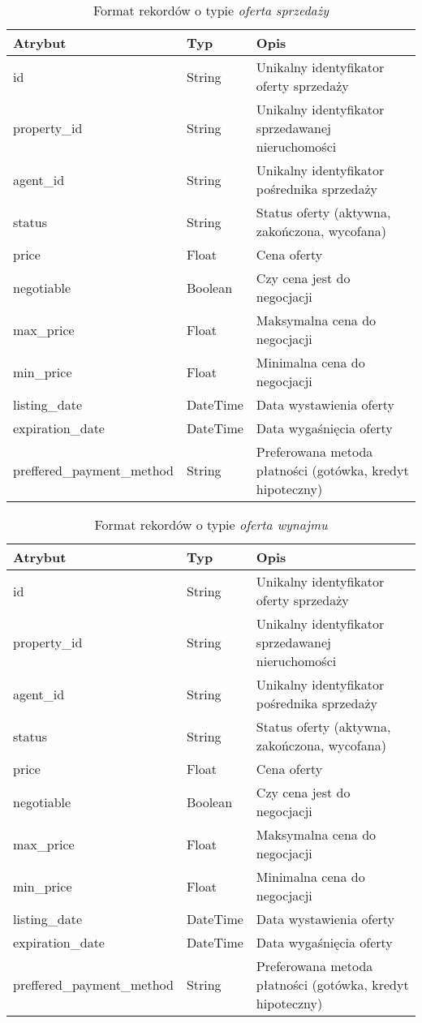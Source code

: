 \begin{table}[H]
    \caption{Format rekordów o typie \textit{oferta sprzedaży}}
    \centering
    \begin{tabular}{|l|l|l|}
    \hline
    \textbf{Atrybut} & \textbf{Typ} & \textbf{Opis} \\
    \hline
    id & String & Unikalny identyfikator oferty sprzedaży \\
    property\_id & String & Unikalny identyfikator sprzedawanej nieruchomości \\
    agent\_id & String & Unikalny identyfikator pośrednika sprzedaży \\
    status & String & Status oferty (aktywna, zakończona, wycofana) \\
    price & Float & Cena oferty \\
    negotiable & Boolean & Czy cena jest do negocjacji \\    
    max\_price & Float & Maksymalna cena do negocjacji \\
    min\_price & Float & Minimalna cena do negocjacji \\
    listing\_date & DateTime & Data wystawienia oferty \\
    expiration\_date & DateTime & Data wygaśnięcia oferty \\
    preffered\_payment\_method & String & Preferowana metoda płatności (gotówka, kredyt hipoteczny) \\
    \hline
    \end{tabular}
    \label{tab:sell_offer_details}
\end{table}

\begin{table}[H]
    \caption{Format rekordów o typie \textit{oferta wynajmu}}
    \centering
    \begin{tabular}{|l|l|l|}
    \hline
    \textbf{Atrybut} & \textbf{Typ} & \textbf{Opis} \\
    \hline
    id & String & Unikalny identyfikator oferty sprzedaży \\
    property\_id & String & Unikalny identyfikator sprzedawanej nieruchomości \\
    agent\_id & String & Unikalny identyfikator pośrednika sprzedaży \\
    status & String & Status oferty (aktywna, zakończona, wycofana) \\
    price & Float & Cena oferty \\
    negotiable & Boolean & Czy cena jest do negocjacji \\    
    max\_price & Float & Maksymalna cena do negocjacji \\
    min\_price & Float & Minimalna cena do negocjacji \\
    listing\_date & DateTime & Data wystawienia oferty \\
    expiration\_date & DateTime & Data wygaśnięcia oferty \\
    preffered\_payment\_method & String & Preferowana metoda płatności (gotówka, kredyt hipoteczny) \\
    \hline
    \end{tabular}
    \label{tab:sell_offer_details}
\end{table}

